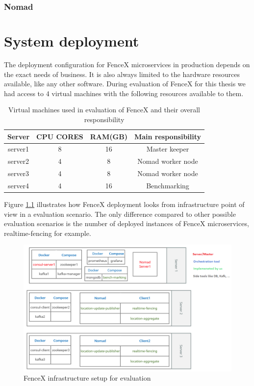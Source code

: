 \documentclass[a4]{report}
\begin{document}
    \subsection{Nomad}

    \chapter{System deployment}
    The deployment configuration for FenceX microservices in production depends on the exact needs of business.
    It is also always limited to the hardware resources available, like any other software.
    During evaluation of FenceX for this thesis we had access to 4 virtual machines with the following resources
    available to them.

    \begin{table}[h!]
        \centering
        \begin{tabular}{|c|c|c|c|}
            \hline
            Server  & CPU CORES & RAM(GB) & Main responsibility \\
            \hline
            server1 & 8         & 16      & Master keeper       \\
            server2 & 4         & 8       & Nomad worker node   \\
            server3 & 4         & 8       & Nomad worker node   \\
            server4 & 4         & 16      & Benchmarking        \\
            \hline
        \end{tabular}
        \caption{Virtual machines used in evaluation of FenceX and their overall responsibility}
        \label{table:vms}
    \end{table}

    Figure \ref{fig:infrastructure} illustrates how FenceX deployment looks from infrastructure point of view in a
    evaluation scenario.
    The only difference compared to other possible evaluation scenarios is the number of deployed instances of FenceX
    microservices, realtime-fencing for example.

    \begin{figure}[h!]
        \centering
        \caption{FenceX infrastructure setup for evaluation}
        \label{fig:infrastructure}
        \includegraphics[scale=0.6]{images/Infrsutracture.png}
    \end{figure}
\end{document}

